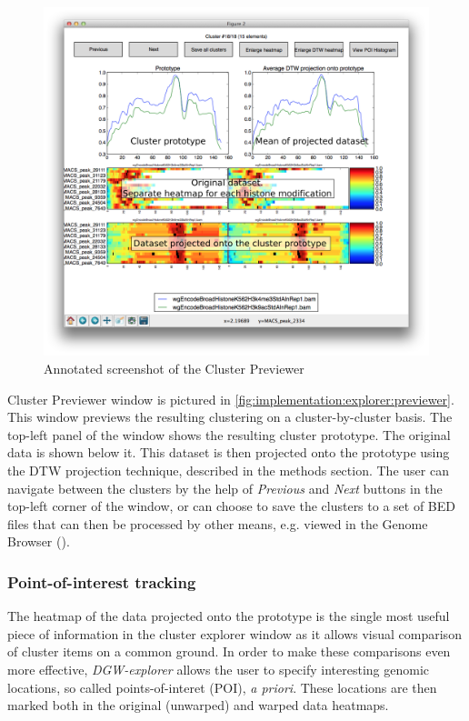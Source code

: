 \documentclass[parskip]{cs4rep}
\begin{document}
\begin{figure}[p]
    \centering
    \includegraphics[height=0.45\textheight]{figures/implementation/explorer/previewer-window.png}
    \caption{Annotated screenshot of the Cluster Previewer}
    \label{fig:implementation:explorer:previewer}
\end{figure}
 
Cluster Previewer window is pictured in \autoref{fig:implementation:explorer:previewer}.
This window previews the resulting clustering on a cluster-by-cluster basis. The top-left panel of the window shows the resulting cluster prototype. The original data is shown below it. This dataset is then projected onto the prototype using the DTW projection technique, described in the methods section. The user can navigate between the clusters by the help of \emph{Previous} and \emph{Next} buttons in the top-left corner of the window, or can choose to save the clusters to a set of BED files that can then be processed by other means, e.g. viewed in the Genome Browser (\cite{Kent:2002wd}).

\subsubsection{Point-of-interest tracking}
The heatmap of the data projected onto the prototype is the single most useful piece of information in the cluster explorer window as it allows visual comparison of cluster items on a common ground.
In order to make these comparisons even more effective, \emph{DGW-explorer} allows the user to specify interesting genomic locations, so called points-of-interet (POI), \emph{a priori}. These locations are then marked both in the original (unwarped) and warped data heatmaps.
\end{document}
